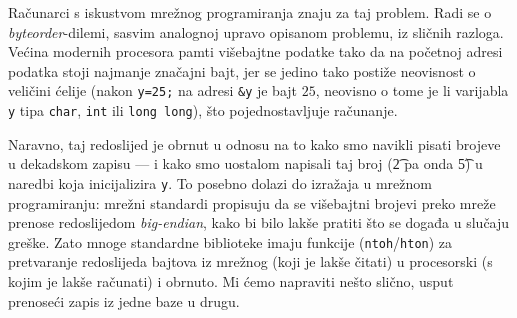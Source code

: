 Računarci s iskustvom mrežnog programiranja znaju za taj problem. Radi se o \emph{byteorder}-dilemi, sasvim analognoj upravo opisanom problemu, iz sličnih razloga. Većina modernih procesora pamti višebajtne podatke tako da na početnoj adresi podatka stoji najmanje značajni bajt, jer se jedino tako postiže neovisnost o veličini ćelije %
(nakon \texttt{y=25;} na adresi \texttt{\&y} je bajt $25$, neovisno o tome je li varijabla \texttt y tipa \texttt{char}, \texttt{int} ili \texttt{long~long}), što pojednostavljuje računanje. %

Naravno, taj redoslijed je obrnut u odnosu na to kako smo navikli pisati brojeve u dekadskom zapisu --- i kako smo uostalom napisali taj broj (\t2 pa onda \t5) u naredbi koja inicijalizira \texttt y. To posebno dolazi do izražaja u mrežnom programiranju: mrežni standardi propisuju da se višebajtni brojevi preko mreže prenose redoslijedom \emph{big-endian}, kako bi bilo lakše pratiti što se događa u slučaju greške. Zato mnoge standardne biblioteke imaju funkcije (\texttt{ntoh}/\texttt{hton}) za pretvaranje redoslijeda bajtova iz mrežnog (koji je lakše čitati) u procesorski (s kojim je lakše računati) i obrnuto. Mi ćemo napraviti nešto slično, usput prenoseći zapis iz jedne baze u drugu.

